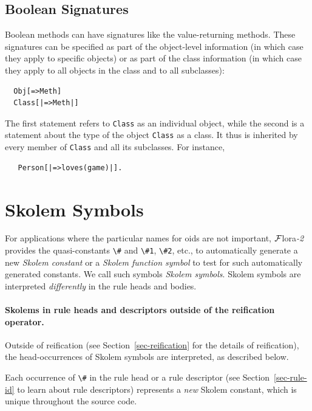 \documentclass[11pt]{article}
\newcommand{\FLORA}{{\mbox{\sc ${\cal F}${lora}\rm\emph{-2}}}\xspace}
\newcommand{\FLSYSTEM}{\FLORA}
\begin{document}
\subsection{Boolean Signatures}

Boolean methods can have signatures like the value-returning methods.
These signatures can be specified as part of the object-level information
(in which case they apply to specific objects) or as part of the class
information (in which case they apply to all objects in the class and to
all subclasses):
\begin{verbatim}
  Obj[=>Meth]
  Class[|=>Meth|]
\end{verbatim}
The first statement refers to \texttt{Class} as an individual object, while
the second is a statement about the type of
the object \texttt{Class} as a class.
It thus is inherited by every member of \texttt{Class} and all its
subclasses. 
For instance,
\begin{verbatim}
   Person[|=>loves(game)|].
\end{verbatim}


\section{Skolem Symbols}\label{sec-anon-gen-oids}


%
For applications where the particular names for
oids are not important, \FLSYSTEM provides the
quasi-constants \verb|\#| and \verb|\#1|, \verb|\#2|, etc.,
to automatically generate a new
\emph{Skolem constant} or a \emph{Skolem function symbol}
to test for such automatically generated
constants. We call such symbols \emph{Skolem symbols}.   Skolem symbols are
interpreted \emph{differently}
in the rule heads and bodies.

\paragraph{Skolems in rule heads and descriptors outside of the reification
  operator.}
Outside of reification (see
Section~\ref{sec-reification} for the details of reification), the
head-occurrences of Skolem symbols are interpreted, as described below.

Each occurrence of \verb|\#| in the rule head or a rule descriptor (see
Section~\ref{sec-rule-id} to learn about rule descriptors)
represents a \emph{new} Skolem constant, which is unique throughout
the source code.
\end{document}
